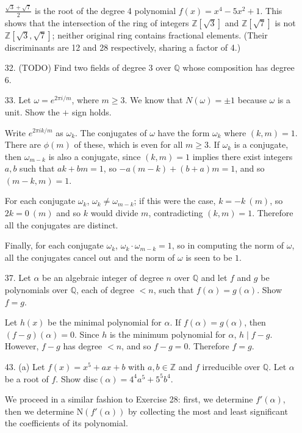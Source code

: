 \documentclass{article}
\newcommand{\w}[0]{\omega}
\newcommand{\Q}[0]{\mathbb{Q}}
\newcommand{\Z}[0]{\mathbb{Z}}
\newcommand{\norm}[1]{\text{N}(#1)}
\newcommand{\disc}[1]{\text{disc}(#1)}
\begin{document}
\begin{enumerate}
$\frac{\sqrt{3} + \sqrt{7}}{2}$ is the root of the degree 4 polynomial $f(x) = x^4 - 5x^2 + 1$.  This shows that the intersection of the ring of integers $\Z[\sqrt{3}]$ and $\Z[\sqrt{7}]$ is not $\Z[\sqrt{3}, \sqrt{7}]$; neither original ring contains fractional elements.  (Their discriminants are 12 and 28 respectively, sharing a factor of 4.)

\item[32.]{(TODO)} Find two fields of degree 3 over $\Q$ whose composition has degree 6.

\item[33.] Let $\w = e^{2\pi i / m}$, where $m \ge 3$.  We know that $N(\w) = \pm 1$ because $\w$ is a unit.  Show the $+$ sign holds.

Write $e^{2\pi i k /m}$ as $\w_k$.  The conjugates of $\w$ have the form $\w_k$ where $(k, m) = 1$.  There are $\phi(m)$ of these, which is even for all $m \ge 3$.  If $\w_k$ is a conjugate, then $\w_{m - k}$ is also a conjugate, since $(k, m) = 1$ implies there exist integers $a, b$ such that $ak + bm = 1$, so $-a(m - k) + (b + a)m = 1$, and so $(m - k, m) = 1$.

For each conjugate $\w_k$, $\w_k \ne \w_{m - k}$; if this were the case, $k = -k \ (m)$, so $2k = 0 \ (m)$ and so $k$ would divide $m$, contradicting $(k, m) = 1$.  Therefore all the conjugates are distinct.

Finally, for each conjugate $\w_{k}$, $\w_k \cdot \w_{m - k} = 1$, so in computing the norm of $\w$, all the conjugates cancel out and the norm of $\w$ is seen to be $1$.

\item[37.] Let $\alpha$ be an algebraic integer of degree $n$ over $\Q$ and let $f$ and $g$ be polynomials over $\Q$, each of degree $< n$, such that $f(\alpha) = g(\alpha)$.  Show $f = g$.

Let $h(x)$ be the minimal polynomial for $\alpha$.  If $f(\alpha) = g(\alpha)$, then $(f - g)(\alpha) = 0$.  Since $h$ is the minimum polynomial for $\alpha$, $h \mid f - g$.  However, $f - g$ has degree $< n$, and so $f - g = 0$.  Therefore $f = g$.

\item[43. (a)] Let $f(x) = x^5 + ax + b$ with $a, b \in \Z$ and $f$ irreducible over $\Q$.  Let $\alpha$ be a root of $f$.  Show $\disc{\alpha} = 4^4 a^5 + 5^5 b^4$.

We proceed in a similar fashion to Exercise 28: first, we determine $f'(\alpha)$, then we determine $\norm{f'(\alpha)}$ by collecting the most and least significant the coefficients of its polynomial.


\end{enumerate}
\end{document}
